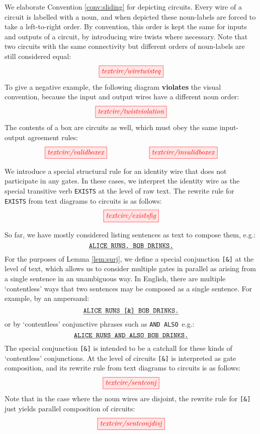 \begin{convention}\label{conv:wireorder}
We elaborate Convention \ref{conv:sliding} for depicting circuits. Every wire of a circuit is labelled with a noun, and when depicted these noun-labels are forced to take a left-to-right order. By convention, this order is kept the same for inputs and outputs of a circuit, by introducing wire twists where necessary. Note that two circuits with the same connectivity but different orders of noun-labels are still considered equal:
\[
\tikzfig{textcirc/wiretwisteq}
\]
To give a negative example, the following diagram \textbf{\bR violates\e} the visual convention, because the input and output wires have a different noun order:
\[
\bR\tikzfig{textcirc/twistviolation}\e
\]
The contents of a box are  circuits as well, which must obey the same input-output agreement rules:
\[
\tikzfig{textcirc/validboxex} \quad\quad\quad\quad\quad\quad \bR \tikzfig{textcirc/invalidboxex} \e
\]
\end{convention} 

\begin{refinement}\label{asm:exists}
We introduce a special structural rule for an identity wire that does not participate in any gates. In these cases, we interpret the identity wire as the special transitive verb \texttt{EXISTS} at the level of raw text. The rewrite rule for \texttt{EXISTS} from text diagrams to circuits is as follows:
\[
\tikzfig{textcirc/existsfig}
\]
\end{refinement}  

\begin{refinement}\label{asm:conj}
So far, we have mostly considered listing sentences as text to compose them, e.g.:
\[
\texttt{\underline{ALICE RUNS. BOB DRINKS.}}
\]
For the purposes of Lemma \ref{lem:surj}, we define a special conjunction \texttt{[\&]} at the level of text, which allows us to consider multiple gates in parallel as arising from a single sentence in an unambiguous way. In English, there are multiple `contentless' ways that two sentences may be composed as a single sentence. For example, by an ampersand:
\[
\texttt{\underline{ALICE RUNS [\&] BOB DRINKS.}}
\]
or by `contentless' conjunctive phrases such as \texttt{AND ALSO}~e.g.: 
\[
\texttt{\underline{ALICE RUNS AND ALSO BOB DRINKS.}}
\]
The special conjunction \texttt{[\&]} is intended to be a catchall for these kinds of `contentless' conjunctions. At the level of circuits \texttt{[\&]} is interpreted as gate composition, and its rewrite rule from text diagrams to circuits is as follows:
\[
\tikzfig{textcirc/sentconj}
\]
Note that in the case where the noun wires are disjoint, the rewrite rule for \texttt{[\&]} just yields parallel composition of circuits:
\[
\tikzfig{textcirc/sentconjdisj}
\]
\end{refinement}

